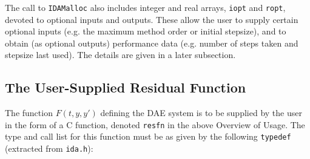 \documentclass[11pt]{article}
\begin{document}
\vspace{.2 in}

The call to {\tt IDAMalloc} also includes integer and real arrays, 
{\tt iopt} and {\tt ropt}, devoted to optional inputs and outputs.
These allow the user to supply certain optional inputs (e.g. the
maximum method order or initial stepsize), and to obtain (as optional
outputs) performance data (e.g. number of steps taken and stepsize
last used).  The details are given in a later subsection.


\subsection{The User-Supplied Residual Function}

The function $F(t,y,y')$ defining the DAE system is to be supplied by
the user in the form of a C function, denoted {\tt resfn} in the above
Overview of Usage.  The type and call list for this function must be
as given by the following {\tt typedef} (extracted from {\tt ida.h}):

\end{document}
